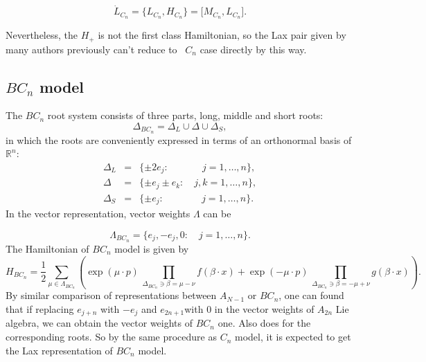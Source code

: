 \documentclass[a4paper,12pt]{article}
\begin{document}
\begin{equation}
\dot{L}_{C_{n}}=\{L_{C_{n}},H_{C_{n}}\}=\lbrack M_{C_{n}},L_{C_{n}}\rbrack .
\label{cnLax}
\end{equation}

Nevertheless, the $H_{+}$ is not the first class Hamiltonian, so the Lax
pair given by many authors previously can't reduce to \ $C_{n}$ case
directly by this way.

\subsection{$BC_{n}$ model}

The $BC_{n}$ root system consists of three parts, long, middle and short
roots:
\begin{equation}
\Delta _{BC_{n}}=\Delta _{L}\cup \Delta \cup \Delta _{S},  \label{bcnroot}
\end{equation}
in which the roots are conveniently expressed in terms of an orthonormal
basis of ${\mathbb R}^{n}$:
\begin{eqnarray}
\Delta _{L} &=&\{\pm 2e_{j}:\qquad \quad \ \ j=1,\ldots ,n\},  \nonumber \\
\Delta &=&\{\pm e_{j}\pm e_{k}:\quad j,k=1,\ldots ,n\},	 \nonumber \\
\Delta _{S} &=&\{\pm e_{j}:\qquad \quad \ \ \ \ j=1,\ldots ,n\}.
\label{bcnroots}
\end{eqnarray}
In the vector representation, vector weights $\Lambda $ can be

\begin{equation}
\Lambda _{BC_{n}}=\{e_{j},-e_{j},0:\quad j=1,\ldots ,n\}.
\end{equation}
The Hamiltonian of $BC_{n}$ model is given by
\begin{equation}
H_{BC_{n}}=\frac{1}{2}\sum_{\mu \in \Lambda _{BC_{n}}}\left( \exp \left( \mu
\cdot p\right) \,\prod_{\Delta _{BC_{n}}\ni \beta =\mu -\nu }f(\beta \cdot x)%
{+}\exp \left( -\mu \cdot p\right) \,\prod_{\Delta _{BC_{n}}\ni \beta =-\mu
+\nu }g(\beta \cdot x)\right) .	 \label{bcnhami}
\end{equation}
By similar comparison of representations between $A_{N-1}$ or $BC_{n}$, one
can found that if replacing $e_{j+n}$ with $-e_{j}$ and $e_{2n+1}$with $0$
in the vector weights of $A_{2n}$ Lie algebra, we can obtain the vector
weights of $\allowbreak BC_{n}$ one. Also does for the corresponding roots.
So by the same procedure as $C_{n}$ model, it is expected to get the Lax
representation of $BC_{n}$ model.
\end{document}
